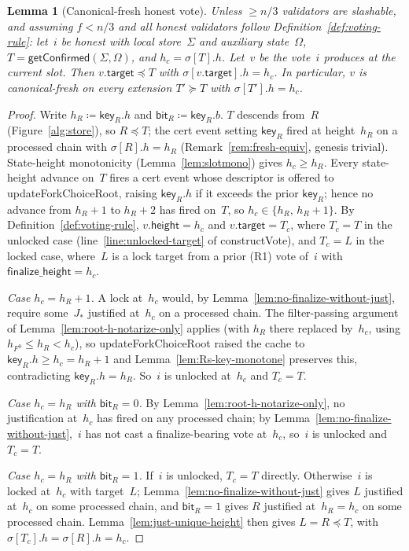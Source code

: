 \documentclass{article}
\newcommand{\target}{\mathsf{target}}
\newcommand{\height}{\mathsf{height}}
\newcommand{\finalizeHeight}{\mathsf{finalize\_height}}
\newcommand{\key}{\mathsf{key}}
\newcommand{\bit}{\mathsf{bit}}
\newcommand{\constructVote}{\textsf{constructVote}\xspace}
\newcommand{\updateForkChoiceRoot}{\textsf{updateForkChoiceRoot}\xspace}
\newcommand{\getConfirmed}{\textsf{getConfirmed}\xspace}
\theoremstyle{plain}
\newtheorem{lemma}{Lemma}
\theoremstyle{definition}
\theoremstyle{remark}
\begin{document}
\begin{lemma}[Canonical-fresh honest vote]\label{lem:canonical-fresh-honest-vote}
Unless $\geq n/3$ validators are slashable, and assuming $f < n/3$ and all honest validators follow Definition~\ref{def:voting-rule}: let~$i$ be honest with local store~$\Sigma$ and auxiliary state~$\Omega$, $T = \getConfirmed(\Sigma, \Omega)$, and $h_c = \sigma[T].h$.
Let~$v$ be the vote~$i$ produces at the current slot.
Then $v.\target \preceq T$ with $\sigma[v.\target].h = h_c$.
In particular, $v$ is canonical-fresh on every extension $T' \succeq T$ with $\sigma[T'].h = h_c$.
\end{lemma}

\begin{proof}
Write $h_R \coloneqq \key_R.h$ and $\bit_R \coloneqq \key_R.b$.
$T$ descends from~$R$ (Figure~\ref{alg:store}), so $R \preceq T$; the cert event setting $\key_R$ fired at height~$h_R$ on a processed chain with $\sigma[R].h = h_R$ (Remark~\ref{rem:fresh-equiv}, genesis trivial).
State-height monotonicity (Lemma~\ref{lem:slotmono}) gives $h_c \geq h_R$.
Every state-height advance on~$T$ fires a cert event whose descriptor is offered to \updateForkChoiceRoot, raising $\key_R.h$ if it exceeds the prior $\key_R$; hence no advance from $h_R + 1$ to $h_R + 2$ has fired on~$T$, so $h_c \in \{h_R,\, h_R + 1\}$.
By Definition~\ref{def:voting-rule}, $v.\height = h_c$ and $v.\target = T_c$, where $T_c = T$ in the unlocked case (line~\ref{line:unlocked-target} of \constructVote{}), and $T_c = L$ in the locked case, where~$L$ is a lock target from a prior (R1) vote of~$i$ with $\finalizeHeight = h_c$.

\emph{Case $h_c = h_R + 1$.}
A lock at~$h_c$ would, by Lemma~\ref{lem:no-finalize-without-just}, require some~$J_\ast$ justified at~$h_c$ on a processed chain.
The filter-passing argument of Lemma~\ref{lem:root-h-notarize-only} applies (with $h_R$ there replaced by~$h_c$, using $h_{F^0} \leq h_R < h_c$), so \updateForkChoiceRoot raised the cache to $\key_R.h \geq h_c = h_R + 1$ and Lemma~\ref{lem:Rs-key-monotone} preserves this, contradicting $\key_R.h = h_R$.
So~$i$ is unlocked at~$h_c$ and $T_c = T$.

\emph{Case $h_c = h_R$ with $\bit_R = 0$.}
By Lemma~\ref{lem:root-h-notarize-only}, no justification at~$h_c$ has fired on any processed chain; by Lemma~\ref{lem:no-finalize-without-just},~$i$ has not cast a finalize-bearing vote at~$h_c$, so~$i$ is unlocked and $T_c = T$.

\emph{Case $h_c = h_R$ with $\bit_R = 1$.}
If~$i$ is unlocked, $T_c = T$ directly.
Otherwise~$i$ is locked at~$h_c$ with target~$L$; Lemma~\ref{lem:no-finalize-without-just} gives $L$ justified at~$h_c$ on some processed chain, and $\bit_R = 1$ gives $R$ justified at~$h_R = h_c$ on some processed chain.
Lemma~\ref{lem:just-unique-height} then gives $L = R \preceq T$, with $\sigma[T_c].h = \sigma[R].h = h_c$.
\end{proof}
\end{document}
